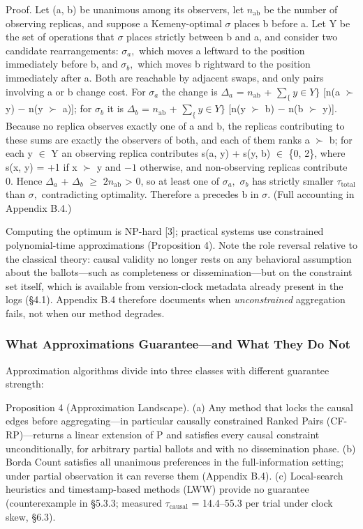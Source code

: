 \documentclass[11pt]{article}
\begin{document}
Proof. Let (a, b) be unanimous among its observers, let $n_{\mathrm{ab}}$ be the number of observing replicas, and suppose a Kemeny-optimal $\sigma $ places b before a. Let Y be the set of operations that $\sigma $ places strictly between b and a, and consider two candidate rearrangements: $\sigma _{a},$ which moves a leftward to the position immediately before b, and $\sigma _{b},$ which moves b rightward to the position immediately after a. Both are reachable by adjacent swaps, and only pairs involving a or b change cost. For $\sigma _{a}$ the change is $\Delta _{a}$ = $n_{\mathrm{ab}}$ + $\sum _\{y\in Y\}$ [n(a $\succ $ y) $-$ n(y $\succ $ a)]; for $\sigma _{b}$ it is $\Delta _{b}$ = $n_{\mathrm{ab}}$ + $\sum _\{y\in Y\}$ [n(y $\succ $ b) $-$ n(b $\succ $ y)]. Because no replica observes exactly one of a and b, the replicas contributing to these sums are exactly the observers of both, and each of them ranks a $\succ $ b; for each y $\in $ Y an observing replica contributes s(a, y) + s(y, b) $\in $ \{0, 2\}, where s(x, y) = +1 if x $\succ $ y and $-1$ otherwise, and non-observing replicas contribute 0. Hence $\Delta _{a}$ + $\Delta _{b}$ $\geq $ $2n_{\mathrm{ab}}$ > 0, so at least one of $\sigma _{a},$ $\sigma _{b}$ has strictly smaller $\tau _{\mathrm{total}}$ than $\sigma ,$ contradicting optimality. Therefore a precedes b in $\sigma .$ (Full accounting in Appendix B.4.)

Computing the optimum is NP-hard [3]; practical systems use constrained polynomial-time approximations (Proposition 4). Note the role reversal relative to the classical theory: causal validity no longer rests on any behavioral assumption about the ballots—such as completeness or dissemination—but on the constraint set itself, which is available from version-clock metadata already present in the logs (§4.1). Appendix B.4 therefore documents when \emph{unconstrained} aggregation fails, not when our method degrades.

\subsubsection{What Approximations Guarantee—and What They Do Not}
Approximation algorithms divide into three classes with different guarantee strength:

Proposition 4 (Approximation Landscape). (a) Any method that locks the causal edges before aggregating—in particular causally constrained Ranked Pairs (CF-RP)—returns a linear extension of P and satisfies every causal constraint unconditionally, for arbitrary partial ballots and with no dissemination phase. (b) Borda Count satisfies all unanimous preferences in the full-information setting; under partial observation it can reverse them (Appendix B.4). (c) Local-search heuristics and timestamp-based methods (LWW) provide no guarantee (counterexample in §5.3.3; measured $\tau _{\mathrm{causal}}$ = 14.4–55.3 per trial under clock skew, §6.3).
\end{document}
